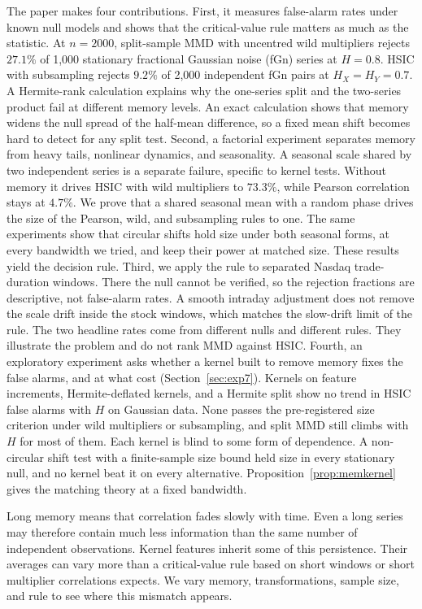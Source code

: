\documentclass[11pt]{article}
\theoremstyle{remark}
\begin{document}
The paper makes four contributions. First, it measures false-alarm rates under known null models and shows that the critical-value rule matters as much as the statistic. At $n=2000$, split-sample MMD with uncentred wild multipliers rejects $27.1\%$ of 1,000 stationary fractional Gaussian noise (fGn) series at $H=0.8$. HSIC with subsampling rejects $9.2\%$ of 2,000 independent fGn pairs at $H_X=H_Y=0.7$. A Hermite-rank calculation explains why the one-series split and the two-series product fail at different memory levels. An exact calculation shows that memory widens the null spread of the half-mean difference, so a fixed mean shift becomes hard to detect for any split test. Second, a factorial experiment separates memory from heavy tails, nonlinear dynamics, and seasonality. A seasonal scale shared by two independent series is a separate failure, specific to kernel tests. Without memory it drives HSIC with wild multipliers to $73.3\%$, while Pearson correlation stays at $4.7\%$. We prove that a shared seasonal mean with a random phase drives the size of the Pearson, wild, and subsampling rules to one. The same experiments show that circular shifts hold size under both seasonal forms, at every bandwidth we tried, and keep their power at matched size. These results yield the decision rule. Third, we apply the rule to separated Nasdaq trade-duration windows. There the null cannot be verified, so the rejection fractions are descriptive, not false-alarm rates. A smooth intraday adjustment does not remove the scale drift inside the stock windows, which matches the slow-drift limit of the rule. The two headline rates come from different nulls and different rules. They illustrate the problem and do not rank MMD against HSIC. Fourth, an exploratory experiment asks whether a kernel built to remove memory fixes the false alarms, and at what cost (Section~\ref{sec:exp7}). Kernels on feature increments, Hermite-deflated kernels, and a Hermite split show no trend in HSIC false alarms with $H$ on Gaussian data. None passes the pre-registered size criterion under wild multipliers or subsampling, and split MMD still climbs with $H$ for most of them. Each kernel is blind to some form of dependence. A non-circular shift test with a finite-sample size bound \citep{harris2020shift} held size in every stationary null, and no kernel beat it on every alternative. Proposition~\ref{prop:memkernel} gives the matching theory at a fixed bandwidth.

Long memory means that correlation fades slowly with time. Even a long series may therefore contain much less information than the same number of independent observations. Kernel features inherit some of this persistence. Their averages can vary more than a critical-value rule based on short windows or short multiplier correlations expects. We vary memory, transformations, sample size, and rule to see where this mismatch appears.
\end{document}
